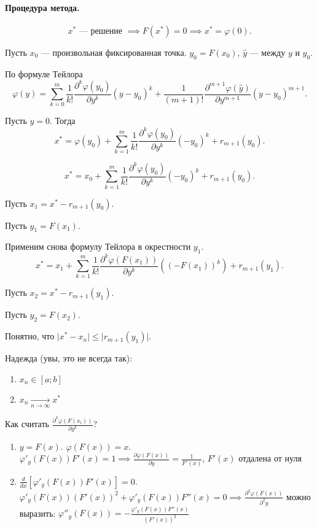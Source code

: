 \paragraph{Процедура метода.}
\[
	x^* \text{ --- решение } \implies F(x^*) = 0 \implies x^* = \varphi(0).
\]

Пусть $x_0$ --- произвольная фиксированная точка. $y_0 = F(x_0)$, $\hat{y}$ --- между $y$ и $y_0$.

По формуле Тейлора
\[
	\varphi(y) = \sum\limits_{k = 0}^m \frac{1}{k!} \frac{\partial^k \varphi(y_0)}{\partial y^k} (y-y_0)^k + \frac{1}{(m+1)!}\frac{\partial^{m+1}\varphi(\hat{y})}{\partial y^{m+1}}(y-y_0)^{m+1}.
\]

Пусть $y=0$. Тогда
\[
	x^* = \varphi(y_0) + \sum\limits_{k = 1}^m \frac{1}{k!} \frac{\partial^k \varphi(y_0)}{\partial y^k}(-y_0)^k + r_{m+1}(y_0).
\]

\[
	x^* = x_0 + \sum\limits_{k = 1}^m \frac{1}{k!} \frac{\partial^k \varphi(y_0)}{\partial y^k}(-y_0)^k + r_{m+1}(y_0).
\]

Пусть $x_1 = x^* - r_{m+1}(y_0)$.

Пусть $y_1 = F(x_1)$.

Применим снова формулу Тейлора в окрестности $y_1$.
\[
	x^* = x_1 + \sum\limits_{k=1}^m \frac{1}{k!}\frac{\partial^k\varphi(F(x_1))}{\partial y^k}((-F(x_1))^k) + r_{m+1}(y_1).
\]

Пусть $x_2 = x^* - r_{m+1}(y_1)$.

Пусть $y_2 = F(x_2)$.

Понятно, что $\vert x^* - x_{n}\vert \leq \vert r_{m+1}(y_1) \vert$.


Надежда (увы, это не всегда так):
\begin{enumerate}
	\item $x_n \in [a; b]$
	\item $x_n \underset{n \to \infty}{\longrightarrow} x^*$
\end{enumerate}

Как считать $\frac{\partial^k \varphi(F(x_i))}{\partial y^k}$?
\begin{enumerate}
	\item $y=F(x)$. $\varphi(F(x)) = x$. $\varphi'_y (F(x))F'(x) = 1 \implies \frac{\partial \varphi (F(x))}{\partial y} = \frac{1}{F'(x)}$, $F'(x)$ отдалена от нуля
	\item $\frac{d}{dx}[\varphi'_y (F(x))F'(x)] = 0$. $\varphi'_y (F(x))(F'(x))^2 + \varphi'_y (F(x))F''(x) = 0 \implies \frac {\partial^2 \varphi(F(x))}{\partial^2 y}$ можно выразить: $\varphi''_y (F(x)) = - \frac {\varphi'_y(F(x))F''(x)}{(F'(x))^2}$
\end{enumerate}


